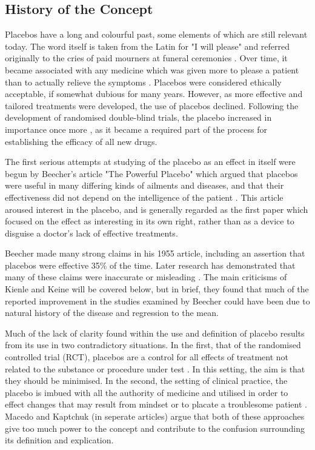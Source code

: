 \subsection{History of the Concept} 
\label{sec:history-concept}

Placebos have a long and colourful past, some elements of which are still relevant today. The word itself is taken from the Latin for "I will please" and referred originally to the cries of paid mourners at funeral ceremonies \cite{Macedo2003}. Over time, it became associated with any medicine which was given more to please a patient than to actually relieve the symptoms \cite{Kaptchuk1998}. Placebos were considered ethically acceptable, if somewhat dubious for many years. However, as more effective and tailored treatments were developed, the use of placebos declined. Following the development of randomised double-blind trials, the  placebo increased in importance once more \cite{Kaptchuk1998}, as it became a required part of the process for establishing the efficacy of all new drugs.  

The first serious attempts at studying of the placebo as an effect in itself  were begun by Beecher's article "The Powerful Placebo" which argued that placebos were useful in many differing kinds of ailments and diseases, and that their effectiveness did not depend on the intelligence of the patient \cite{beecher1955powerful,Kaptchuk1998}.  This article aroused interest in the placebo, and is generally regarded as the first paper which focused on the effect as interesting in its own right, rather than as a device to disguise a doctor's lack of effective treatments. 

Beecher made many strong claims in his 1955 article, including an assertion that placebos were effective 35\% of the time. Later research has demonstrated that many of these claims were  inaccurate or misleading \cite{Kienle1998}. The main criticisms of Kienle and Keine will be covered below, but in brief, they found that much of the reported improvement in the studies examined by Beecher could have been due to natural history of the disease and regression to the mean.  

Much of the lack of clarity found within the use and definition of placebo \cite{Macedo2003,Kaptchuk1998} results from its use in two contradictory situations. In the first, that of the randomised controlled trial (RCT), placebos are a control for all effects of treatment not related to the substance or procedure under test \cite{Vickers2000}. In this setting, the aim is that they should be minimised. In the second, the setting of clinical practice, the placebo is imbued with all the authority of medicine and utilised in order to effect changes that may result from mindset or to placate a troublesome patient \cite{Bootzin2003,Sherman2008a}. Macedo and Kaptchuk (in seperate articles) argue that both of these approaches give too much power to the concept and contribute to the confusion surrounding its definition and explication. 

